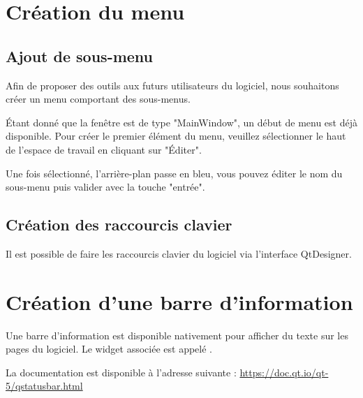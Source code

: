 {

\section{Création du menu}

\subsection{Ajout de sous-menu}

Afin de proposer des outils aux futurs utilisateurs du logiciel, nous souhaitons créer un menu comportant des sous-menus.




Étant donné que la fenêtre est de type "MainWindow", un début de menu est déjà disponible. Pour créer le premier élément du menu, veuillez sélectionner le haut de l'espace de travail en cliquant sur "Éditer". \newline



Une fois sélectionné, l'arrière-plan passe en bleu, vous pouvez éditer le nom du sous-menu puis valider avec la touche "entrée".

\subsection{Création des raccourcis clavier}

Il est possible de faire les raccourcis clavier du logiciel via l'interface QtDesigner. 


\section{Création d'une barre d'information}

Une barre d'information est disponible nativement pour afficher du texte sur les pages du logiciel. \newline Le widget associée est appelé .




La documentation est disponible à l'adresse suivante : \newline \url{https://doc.qt.io/qt-5/qstatusbar.html}

}
